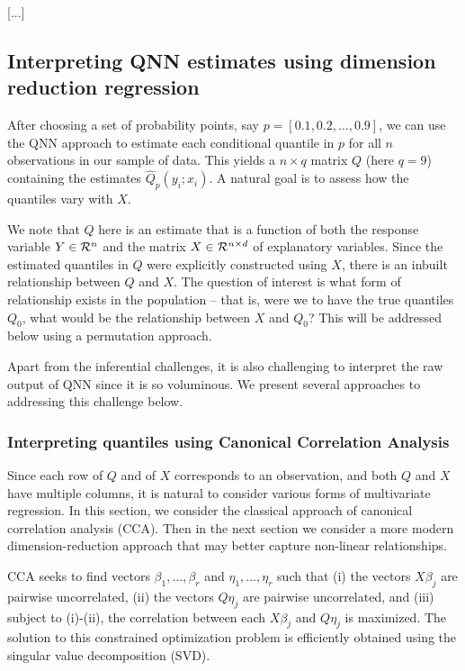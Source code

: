 [...]

\subsection{Interpreting QNN estimates using dimension reduction
regression}

After choosing a set of probability points, say $p=[0.1, 0.2, \ldots,
0.9]$, we can use the QNN approach to estimate each conditional quantile
in $p$ for all $n$ observations in our sample of data.  This yields
a $n\times q$ matrix $Q$ (here $q=9$) containing the estimates
$\hat{Q}_p(y_i; x_i)$.  A natural goal is to assess how the quantiles
vary with $X$.

We note that $Q$ here is an estimate that is a function of both the
response variable $Y\in {\cal R}^n$ and the matrix $X\in {\cal R}^{n\times
d}$ of explanatory variables.  Since the estimated quantiles in $Q$ were
explicitly constructed using $X$, there is an inbuilt relationship between
$Q$ and $X$.  The question of interest is what form of relationship
exists in the population -- that is, were we to have the true quantiles
$Q_0$, what would be the relationship between $X$ and $Q_0$?  This will
be addressed below using a permutation approach.

Apart from the inferential challenges, it is also challenging to interpret
the raw output of QNN since it is so voluminous.  We present several
approaches to addressing this challenge below.

\subsubsection{Interpreting quantiles using Canonical Correlation
Analysis}

Since each row of $Q$ and of $X$ corresponds to an observation, and both
$Q$ and $X$ have multiple columns, it is natural to consider various
forms of multivariate regression.  In this section, we consider the
classical approach of canonical correlation analysis (CCA).  Then in the
next section we consider a more modern dimension-reduction approach that
may better capture non-linear relationships.

CCA seeks to find vectors $\beta_1, \ldots, \beta_r$ and $\eta_1, \ldots,
\eta_r$ such that (i) the vectors $X\beta_j$ are pairwise uncorrelated,
(ii) the vectors $Q\eta_j$ are pairwise uncorrelated, and (iii) subject
to (i)-(ii), the correlation between each $X\beta_j$ and $Q\eta_j$
is maximized.  The solution to this constrained optimization problem is
efficiently obtained using the singular value decomposition (SVD).

